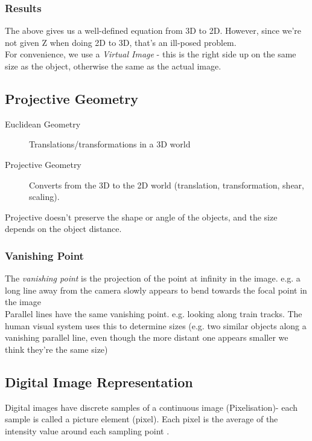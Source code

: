 \subsubsection{Results}
The above gives us a well-defined equation from 3D to 2D. However, since we're not given Z when doing 2D to 3D, that's an ill-posed problem. \\

For convenience, we use a \emph{Virtual Image} - this is the right side up on the same size as the object, otherwise the same as the actual image. 

\subsection{Projective Geometry}
\begin{description}
    \item[Euclidean Geometry] Translations/transformations in a 3D world
    \item[Projective Geometry] Converts from the 3D to the 2D world (translation, transformation, shear, scaling).
\end{description}
Projective doesn't preserve the shape or angle of the objects, and the size depends on the object distance.

\subsubsection{Vanishing Point}
The \emph{vanishing point} is the projection of the point at infinity in the image. e.g. a long line away from the camera slowly appears to bend towards the focal point in the image\\

Parallel lines have the same vanishing point. e.g. looking along train tracks. The human visual system uses this to determine sizes (e.g. two similar objects along a vanishing parallel line, even though the more distant one appears smaller we think they're the same size)

\subsection{Digital Image Representation}
Digital images have discrete samples of a continuous image (Pixelisation)- each sample is called a picture element (pixel). Each pixel is the average of the intensity value around each sampling point .

